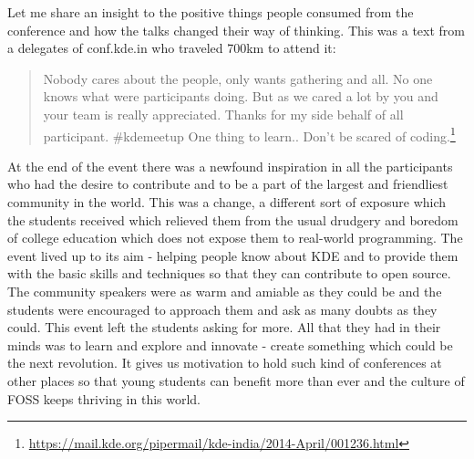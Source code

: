 Let me share an insight to the positive things people consumed from the conference and how the talks changed their way of thinking. This was a text from a delegates of conf.kde.in  who traveled 700km to attend it:

\begin{quote}Nobody cares about the people, only wants gathering and all. No one knows what were participants doing. But as we cared a lot by you and your team is really appreciated. Thanks for my side behalf of all participant.
\newline
\#kdemeetup One thing to learn.. Don’t be scared of coding.\footnote{\url{https://mail.kde.org/pipermail/kde-india/2014-April/001236.html}}\end{quote}

At the end of the event there was a newfound inspiration in all the participants who had the desire to contribute and to be a part of the largest and friendliest community in the world. This was a change, a different sort of exposure which the students received which relieved them from the usual drudgery and boredom of college education which does not expose them to real-world programming. The event lived up to its aim - helping people know about KDE and to provide them with the basic skills and techniques so that they can contribute to open source. The community speakers were as warm and amiable as they could be and the students were encouraged to approach them and ask as many doubts as they could. This event left the students asking for more. All that they had in their minds was to learn and explore and innovate - create something which could be the next revolution. It gives us motivation to hold such kind of conferences at other places so that young students can benefit more than ever and the culture of FOSS keeps thriving in this world.
